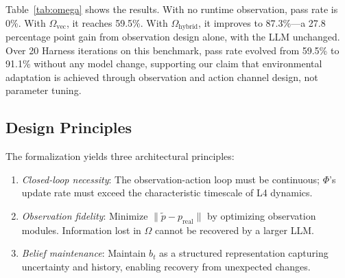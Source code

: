 Table~\ref{tab:omega} shows the results. With no runtime observation, pass rate is 0\%. With \(\Omega_{\text{vec}}\), it reaches 59.5\%. With \(\Omega_{\text{hybrid}}\), it improves to 87.3\%---a 27.8 percentage point gain from observation design alone, with the LLM unchanged. Over 20 Harness iterations on this benchmark, pass rate evolved from 59.5\% to 91.1\% without any model change, supporting our claim that environmental adaptation is achieved through observation and action channel design, not parameter tuning.

\subsection{Design Principles}

The formalization yields three architectural principles:

\begin{enumerate}
\item \emph{Closed-loop necessity}: The observation-action loop must be continuous; \(\Phi\)'s update rate must exceed the characteristic timescale of L4 dynamics.

\item \emph{Observation fidelity}: Minimize \(\| \tilde{p} - p_{\text{real}} \|\) by optimizing observation modules. Information lost in \(\Omega\) cannot be recovered by a larger LLM.

\item \emph{Belief maintenance}: Maintain \(b_t\) as a structured representation capturing uncertainty and history, enabling recovery from unexpected changes.
\end{enumerate}